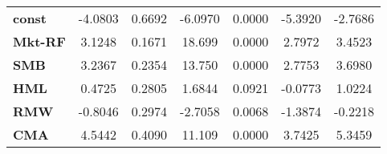 \begin{center}
\begin{tabular}{lcccccc}
\midrule
\textbf{const}  &      -4.0803       &       0.6692       &     -6.0970     &      0.0000      &      -5.3920      &      -2.7686       \\
\textbf{Mkt-RF} &       3.1248       &       0.1671       &      18.699     &      0.0000      &       2.7972      &       3.4523       \\
\textbf{SMB}    &       3.2367       &       0.2354       &      13.750     &      0.0000      &       2.7753      &       3.6980       \\
\textbf{HML}    &       0.4725       &       0.2805       &      1.6844     &      0.0921      &      -0.0773      &       1.0224       \\
\textbf{RMW}    &      -0.8046       &       0.2974       &     -2.7058     &      0.0068      &      -1.3874      &      -0.2218       \\
\textbf{CMA}    &       4.5442       &       0.4090       &      11.109     &      0.0000      &       3.7425      &       5.3459       \\
\bottomrule
\end{tabular}
\end{center}
